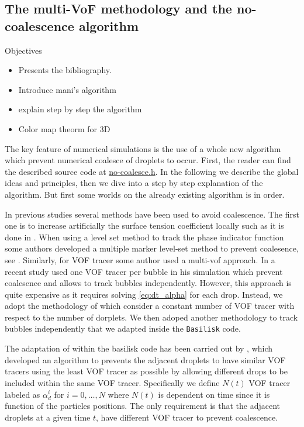 \subsection{The multi-VoF methodology and the no-coalescence algorithm}
Objectives 
\begin{itemize}
    \item Presents the bibliography. 
    \item Introduce mani's algorithm
    \item explain step by step the algorithm
    \item Color map theorm for 3D 
\end{itemize}


The key feature of numerical simulations is the use of a whole new algorithm which prevent numerical coalesce of droplets to occur.
First, the reader can find the described source code at \href{https://basilisk.fr/sandbox/fintzin/no-coalesce.h}{no-coalesce.h}. 
In the following we describe the global ideas and principles, then we dive into a step by step explanation of the algorithm. 
But first some worlds on the already existing algorithm is in order.

In previous studies several methods have been used to avoid coalescence. 
The first one is to increase artificially the surface tension coefficient locally such as it is done in \citet{hidman2023assessing}.
When using a level set method to track the  phase indicator function some authors developed a multiple marker level-set method to prevent coalesence, see \citet{balcazar2015multiple}. 
Similarly, for VOF tracer some author used a multi-vof approach. 
In a recent study \citet{zhang2021direct} used one VOF tracer per bubble in his simulation which prevent coalesence and allows to track bubbles independently. 
However, this approach is quite expensive as it requires solving \ref{eq:dt_alpha} for each drop. 
Instead, we adopt the methodology of \citet{karnakov2022computing} which consider a constant number of VOF tracer with respect to the number of dorplets. 
We then adoped another methodology to track bubbles independently that we adapted inside the \texttt{Basilisk} code. 

The adaptation of \citet{karnakov2022computing} within the basilisk code has been carried out by \citet{mani2021numerical} , which developed an algorithm to prevents the adjacent droplets to have similar VOF tracers using the least VOF tracer as possible by allowing different drops to be included within the same VOF tracer.
Specifically we define $N(t)$ VOF tracer labeled as $\alpha_d^i$ for $i =0,\ldots,N$ where $N(t)$ is dependent on time since it is function of the particles positions.  
The only requirement is that the adjacent droplets at a given time $t$, have different VOF tracer to prevent coalescence. 


